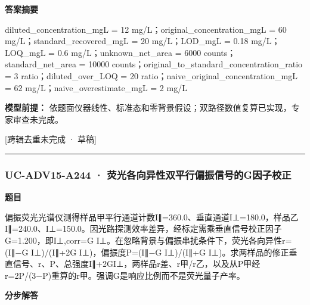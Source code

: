 \documentclass[UTF8,11pt,a4paper]{ctexart}
\begin{document}
\noindent\textbf{答案摘要}\par
diluted\_concentration\_mgL = 12 mg/L；original\_concentration\_mgL = 60 mg/L；standard\_recovered\_mgL = 20 mg/L；LOD\_mgL = 0.18 mg/L；LOQ\_mgL = 0.6 mg/L；unknown\_net\_area = 6000 counts；standard\_net\_area = 10000 counts；original\_to\_standard\_concentration\_ratio = 3 ratio；diluted\_over\_LOQ = 20 ratio；naive\_original\_concentration\_mgL = 62 mg/L；naive\_overestimate\_mgL = 2 mg/L\par
\noindent\textbf{模型前提：}
依题面仪器线性、标准态和零背景假设；双路径数值复算已实现，专家审查未完成。\par
\noindent\textcolor{red!65!black}{[跨辑去重未完成 · 草稿]} \par
\medskip\hrule\medskip
{}
\subsubsection*{UC-ADV15-A244 · 荧光各向异性双平行偏振信号的G因子校正}
\noindent\textbf{题目}\par
偏振荧光光谱仪测得样品甲平行通道计数I∥=360.0、垂直通道I⊥=180.0，样品乙I∥=240.0、I⊥=150.0。因光路探测效率差异，经标定需乘垂直信号校正因子G=1.200，即I⊥,corr=G I⊥。在忽略背景与偏振串扰条件下，荧光各向异性r=(I∥−G I⊥)/(I∥+2G I⊥)，偏振度P=(I∥−G I⊥)/(I∥+G I⊥)。求两样品的修正垂直信号、r、P、总强度I∥+2GI⊥，两样品r差、r甲/r乙，以及从P甲经r=2P/(3−P)重算的r甲。强调G是响应比例而不是荧光量子产率。\par
\medskip\noindent\textbf{分步解答}
\end{document}
